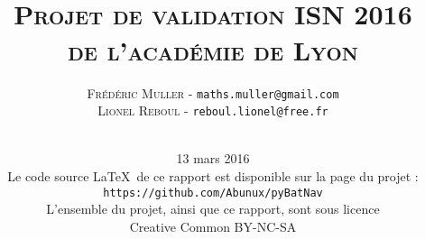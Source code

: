 


\lfoot[\thepage]{}
\rfoot[]{\thepage}
\usepackage{moreverb}



\title{\\ \medskip \medskip\medskip\medskip \large{\textsc{Projet de validation ISN 2016\\de l'académie de Lyon}}}
\author{\textsc{Frédéric Muller} - \texttt{maths.muller@gmail.com}\\ \textsc{Lionel Reboul} - \texttt{reboul.lionel@free.fr}\\ \\ \medskip \medskip
   }
\date{\vfill
13 mars 2016\\
\medskip \medskip \medskip 
Le code source \LaTeX\ de ce rapport est disponible sur la page du projet :\\
\texttt{https://github.com/Abunux/pyBatNav}\\ \medskip
L'ensemble du projet, ainsi que ce rapport, sont sous licence\\Creative Common BY-NC-SA}

\maketitle


\clearpage{\pagestyle{empty}\cleardoublepage}
\setcounter{tocdepth}{1}
\tableofcontents
\thispagestyle{fancy}









